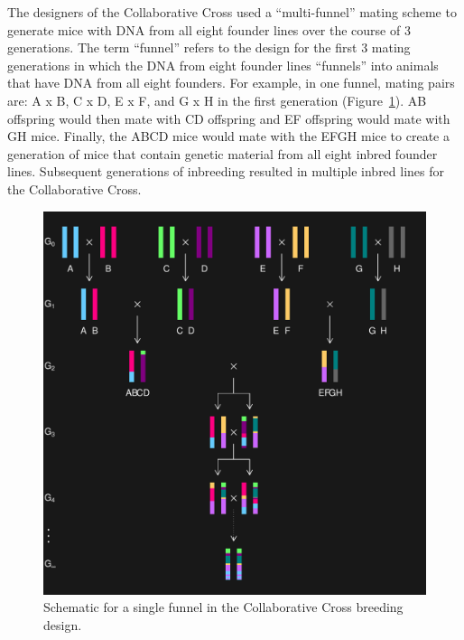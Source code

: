\documentclass[]{article}\usepackage[]{graphicx}\usepackage[]{color}
\makeatletter
\def\maxwidth{ %
  \ifdim\Gin@nat@width>\linewidth
    \linewidth
  \else
    \Gin@nat@width
  \fi
}
\newenvironment{knitrout}{}{} %
\def\maxwidth{\ifdim\Gin@nat@width>\linewidth\linewidth\else\Gin@nat@width\fi}
\makeatother
\begin{document}
The designers of the Collaborative Cross used a ``multi-funnel'' mating scheme to generate
mice with DNA from all eight founder lines over the course of 3 generations.
The term ``funnel'' refers to the design for the first 3 mating generations in which the
DNA from eight founder lines ``funnels'' into animals that have DNA from all eight founders.
For example, in one funnel, mating pairs are: A x B, C x D, E x F, and G x H in the first generation (Figure~\ref{fig:ri8}).
AB offspring would then mate with CD offspring and EF offspring would mate with GH mice.
Finally, the ABCD mice would mate with the EFGH mice to create a generation of mice that
contain genetic material from all eight inbred founder lines.
Subsequent generations of inbreeding resulted in multiple inbred lines for the Collaborative Cross.

\begin{knitrout}
\color{fgcolor}\begin{figure}
\includegraphics[width=\maxwidth]{figure/ri8-1} \caption[Schematic for a single funnel in the Collaborative Cross breeding design]{Schematic for a single funnel in the Collaborative Cross breeding design.}\label{fig:ri8}
\end{figure}


\end{knitrout}
\end{document}
